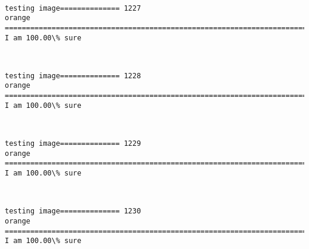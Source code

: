 \documentclass[11pt]{article}
\begin{document}
    \begin{center}
    \end{center}
    { \hspace*{\fill} \\}
    
    \begin{Verbatim}[commandchars=\\\{\}]
testing image============== 1227
orange
============================================================================
I am 100.00\% sure

    \end{Verbatim}

    \begin{center}
    \end{center}
    { \hspace*{\fill} \\}
    
    \begin{Verbatim}[commandchars=\\\{\}]
testing image============== 1228
orange
============================================================================
I am 100.00\% sure

    \end{Verbatim}

    \begin{center}
    \end{center}
    { \hspace*{\fill} \\}
    
    \begin{Verbatim}[commandchars=\\\{\}]
testing image============== 1229
orange
============================================================================
I am 100.00\% sure

    \end{Verbatim}

    \begin{center}
    \end{center}
    { \hspace*{\fill} \\}
    
    \begin{Verbatim}[commandchars=\\\{\}]
testing image============== 1230
orange
============================================================================
I am 100.00\% sure

    \end{Verbatim}
\end{document}
